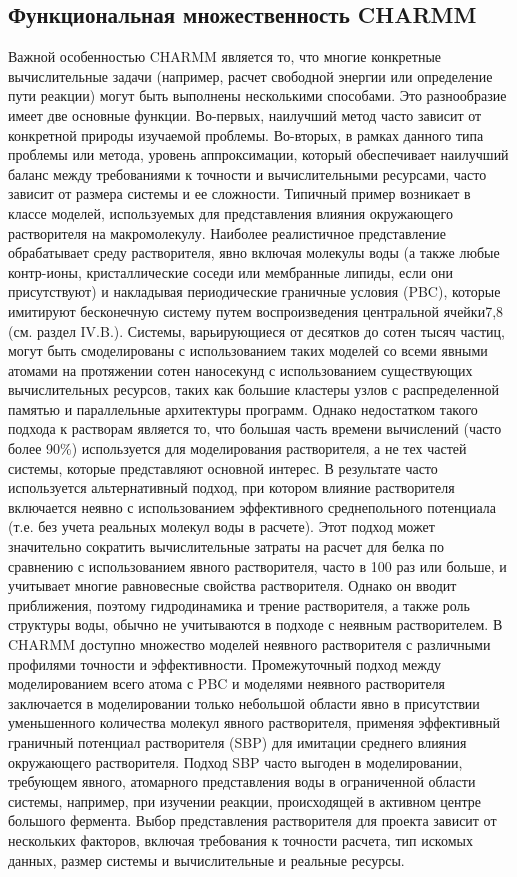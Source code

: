\subsection{Функциональная множественность CHARMM}

Важной особенностью CHARMM является то, что многие конкретные вычислительные задачи (например, расчет свободной энергии или определение пути реакции) могут быть выполнены несколькими способами. Это разнообразие имеет две основные функции. Во-первых, наилучший метод часто зависит от конкретной природы изучаемой проблемы. Во-вторых, в рамках данного типа проблемы или метода, уровень аппроксимации, который обеспечивает наилучший баланс между требованиями к точности и вычислительными ресурсами, часто зависит от размера системы и ее сложности. Типичный пример возникает в классе моделей, используемых для представления влияния окружающего растворителя на макромолекулу. Наиболее реалистичное представление обрабатывает среду растворителя, явно включая молекулы воды (а также любые контр-ионы, кристаллические соседи или мембранные липиды, если они присутствуют) и накладывая периодические граничные условия (PBC), которые имитируют бесконечную систему путем воспроизведения центральной ячейки7,8 (см. раздел IV.B.). Системы, варьирующиеся от десятков до сотен тысяч частиц, могут быть смоделированы с использованием таких моделей со всеми явными атомами на протяжении сотен наносекунд с использованием существующих вычислительных ресурсов, таких как большие кластеры узлов с распределенной памятью и параллельные архитектуры программ. Однако недостатком такого подхода к растворам является то, что большая часть времени вычислений (часто более 90\%) используется для моделирования растворителя, а не тех частей системы, которые представляют основной интерес. В результате часто используется альтернативный подход, при котором влияние растворителя включается неявно с использованием эффективного среднепольного потенциала (т.е. без учета реальных молекул воды в расчете). Этот подход может значительно сократить вычислительные затраты на расчет для белка по сравнению с использованием явного растворителя, часто в 100 раз или больше, и учитывает многие равновесные свойства растворителя. Однако он вводит приближения, поэтому гидродинамика и трение растворителя, а также роль структуры воды, обычно не учитываются в подходе с неявным растворителем. В CHARMM доступно множество моделей неявного растворителя с различными профилями точности и эффективности. Промежуточный подход между моделированием всего атома с PBC и моделями неявного растворителя заключается в моделировании только небольшой области явно в присутствии уменьшенного количества молекул явного растворителя, применяя эффективный граничный потенциал растворителя (SBP) для имитации среднего влияния окружающего растворителя. Подход SBP часто выгоден в моделировании, требующем явного, атомарного представления воды в ограниченной области системы, например, при изучении реакции, происходящей в активном центре большого фермента. Выбор представления растворителя для проекта зависит от нескольких факторов, включая требования к точности расчета, тип искомых данных, размер системы и вычислительные и реальные ресурсы.

